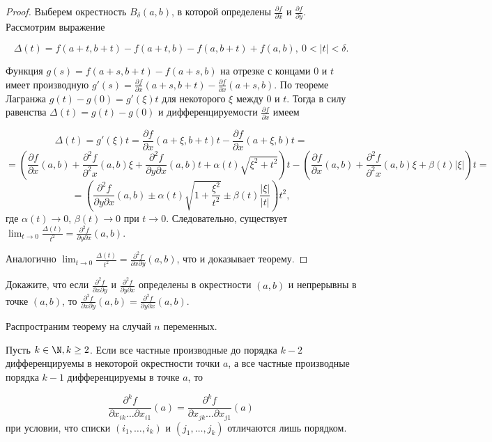 
\begin{proof}
    Выберем окрестность $B_{\delta}(a, b)$, в которой определены $\frac{\partial f}{\partial x}$ и $\frac{\partial f}{\partial y}$. Рассмотрим выражение
    
    \[\Delta(t) = f(a + t, b + t) - f(a + t, b) - f(a, b + t) + f(a, b), \ 0 < |t| < \delta.\]

    Функция $g(s) = f(a + s, b + t) - f(a + s, b)$ на отрезке с концами $0$ и $t$ имеет производную $g'(s) = \frac{\partial f}{\partial x}(a + s, b + t) - \frac{\partial f}{\partial x}(a + s, b)$. По теореме Лагранжа $g(t) - g(0) = g'(\xi)t$ для некоторого $\xi$ между $0$ и $t$. Тогда в силу равенства $\Delta(t) = g(t) - g(0)$ и дифференцируемости $\frac{\partial f}{\partial x}$ имеем

    \[\Delta(t) = g'(\xi)t = \frac{\partial f}{\partial x}(a + \xi, b + t)t - \frac{\partial f}{\partial x}(a + \xi, b)t =\]
    \[= \left(\frac{\partial f}{\partial x}(a, b) + \frac{\partial^2 f}{\partial^2 x}(a, b)\xi + \frac{\partial^2 f}{\partial y \partial x}(a, b)t + \alpha(t)\sqrt{\xi^2 + t^2}\right)t - \left(\frac{\partial f}{\partial x}(a, b) + \frac{\partial^2 f}{\partial^2 x}(a, b)\xi + \beta(t)|\xi|\right)t =\]
    \[= \left(\frac{\partial^2 f}{\partial y \partial x}(a, b) \pm \alpha(t)\sqrt{1 + \frac{\xi^2}{t^2}} \pm \beta(t) \frac{|\xi|}{|t|}\right)t^2,\]
    где $\alpha(t) \to 0$, $\beta(t) \to 0$ при $t \to 0$. Следовательно, существует $\lim_{t \to 0}\frac{\Delta(t)}{t^2} = \frac{\partial^2 f}{\partial y \partial x}(a, b)$.

    Аналогично $\lim_{t \to 0}\frac{\Delta(t)}{t^2} = \frac{\partial^2 f}{\partial x \partial y}(a, b)$, что и доказывает теорему.
\end{proof}

\begin{problem}
    Докажите, что если $\frac{\partial^2 f}{\partial x \partial y}$ и $\frac{\partial^2 f}{\partial y \partial x}$ определены в окрестности $(a, b)$ и непрерывны в точке $(a, b)$, то $\frac{\partial^2 f}{\partial x \partial y}(a, b) = \frac{\partial^2 f}{\partial y \partial x}(a, b)$.
\end{problem}

Распространим теорему на случай $n$ переменных.

\begin{corollary}
    Пусть $k \in \N, k \geq 2$. Если все частные производные до порядка $k - 2$ дифференцируемы в некоторой окрестности точки $a$, а все частные производные порядка $k - 1$ дифференцируемы в точке $a$, то

    \[\frac{\partial^k f}{\partial x_{ik} \ldots \partial x_{i1}}(a) = \frac{\partial^k f}{\partial x_{jk} \ldots \partial x_{j1}}(a)\]
    при условии, что списки $(i_{1}, \ldots, i_{k})$ и $(j_{1}, \ldots, j_{k})$ отличаются лишь порядком.
\end{corollary}

